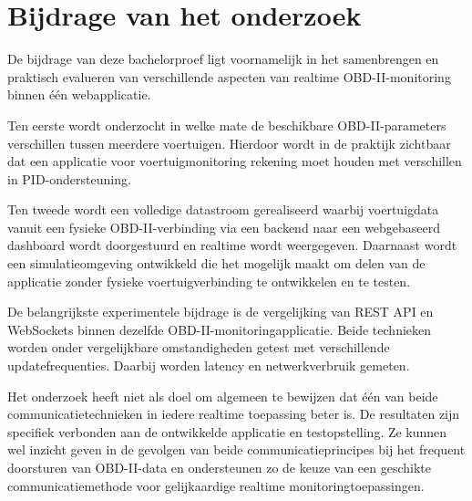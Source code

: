 \section{Bijdrage van het onderzoek}
De bijdrage van deze bachelorproef ligt voornamelijk in het samenbrengen en
praktisch evalueren van verschillende aspecten van realtime
OBD-II-monitoring binnen één webapplicatie.

Ten eerste wordt onderzocht in welke mate de beschikbare OBD-II-parameters
verschillen tussen meerdere voertuigen. Hierdoor wordt in de praktijk zichtbaar
dat een applicatie voor voertuigmonitoring rekening moet houden met verschillen
in PID-ondersteuning.

Ten tweede wordt een volledige datastroom gerealiseerd waarbij voertuigdata
vanuit een fysieke OBD-II-verbinding via een backend naar een webgebaseerd
dashboard wordt doorgestuurd en realtime wordt weergegeven. Daarnaast wordt
een simulatieomgeving ontwikkeld die het mogelijk maakt om delen van de
applicatie zonder fysieke voertuigverbinding te ontwikkelen en te testen.

De belangrijkste experimentele bijdrage is de vergelijking van REST API en
WebSockets binnen dezelfde OBD-II-monitoringapplicatie. Beide technieken
worden onder vergelijkbare omstandigheden getest met verschillende
updatefrequenties. Daarbij worden latency en netwerkverbruik gemeten.

Het onderzoek heeft niet als doel om algemeen te bewijzen dat één van beide
communicatietechnieken in iedere realtime toepassing beter is. De resultaten
zijn specifiek verbonden aan de ontwikkelde applicatie en testopstelling. Ze
kunnen wel inzicht geven in de gevolgen van beide communicatieprincipes bij het
frequent doorsturen van OBD-II-data en ondersteunen zo de keuze van een
geschikte communicatiemethode voor gelijkaardige realtime
monitoringtoepassingen.